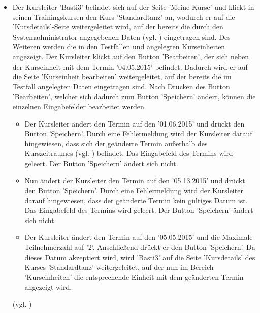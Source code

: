 \documentclass[a4paper]{scrreprt}
\begin{document}
\begin{itemize}
			\item {}
			Der Kursleiter 'Basti3' befindet sich auf der Seite 'Meine Kurse' und klickt in seinen Trainingskursen den Kurs 'Standardtanz' an, wodurch er auf die 'Kursdetails'-Seite weitergeleitet wird, auf der bereits die durch den Systemadministrator angegebenen Daten (vgl. ) eingetragen sind. Des Weiteren werden die in den Testfällen  und  angelegten Kurseinheiten angezeigt. Der Kursleiter klickt auf den Button 'Bearbeiten', der sich neben der Kurseinheit mit dem Termin '04.05.2015' befindet. Dadurch wird er auf die Seite 'Kurseinheit bearbeiten' weitergeleitet, auf der bereits die im Testfall  angelegten Daten eingetragen sind. Nach Drücken des Button 'Bearbeiten', welcher sich dadurch zum Button 'Speichern' ändert, können die einzelnen Eingabefelder bearbeitet werden. 
			\begin{itemize}
				\item Der Kursleiter ändert den Termin auf den '01.06.2015' und drückt den Button 'Speichern'. Durch eine Fehlermeldung wird der Kursleiter darauf hingewiesen, dass sich der geänderte Termin außerhalb des Kurszeitraumes (vgl. ) befindet. Das Eingabefeld des Termins wird geleert. Der Button 'Speichern' ändert sich nicht.
				
				\item Nun ändert der Kursleiter den Termin auf den '05.13.2015' und drückt den Button 'Speichern'. Durch eine Fehlermeldung wird der Kursleiter darauf hingewiesen, dass der geänderte Termin kein gültiges Datum ist. Das Eingabefeld des Termins wird geleert. Der Button 'Speichern' ändert sich nicht.
				
				\item Der Kursleiter ändert den Termin auf den '05.05.2015' und die Maximale Teilnehmerzahl auf '2'. Anschließend drückt er den Button 'Speichern'. Da dieses Datum akzeptiert wird, wird 'Basti3' auf die Seite 'Kursdetails' des Kurses 'Standardtanz' weitergeleitet, auf der nun im Bereich 'Kurseinheiten' die entsprechende Einheit mit dem geänderten Termin angezeigt wird.
			\end{itemize}
			(vgl. )
			

\end{itemize}
\end{document}
